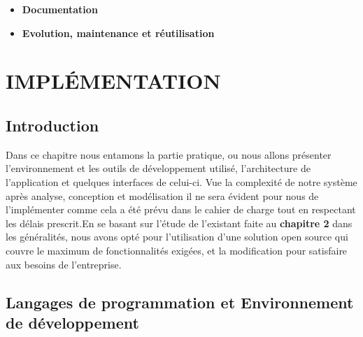 \documentclass[13pt,openany]{report}%
\begin{document}
\begin{itemize}
	\item [\checkmark] \textbf{Documentation}\\
\end{itemize}

\begin{itemize}
	\item [\checkmark] \textbf{Evolution, maintenance et réutilisation}\\
\end{itemize}

\chapter{IMPLÉMENTATION}
\section{Introduction}
 Dans ce chapitre nous entamons la partie pratique, ou nous allons présenter l’environnement et les outils de développement utilisé, l’architecture de l’application et quelques interfaces de celui-ci. Vue la complexité de notre système après analyse, conception et modélisation il ne sera évident pour nous de l'implémenter comme cela a été prévu dans le cahier de charge tout en respectant les délais prescrit.En se basant sur l'étude de l'existant faite au \textbf{chapitre 2} dans les généralités, nous avons opté pour l'utilisation d'une solution open source qui couvre le maximum de fonctionnalités exigées, et la modification pour satisfaire aux besoins de l'entreprise.
\section{Langages de programmation et Environnement de développement}
\end{document}
